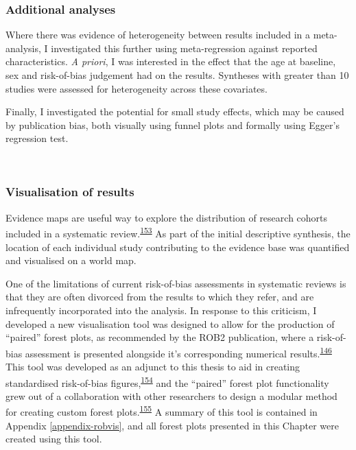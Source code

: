 \documentclass[a4paper, twoside]{templates/ociamthesis}
\begin{document}
\hypertarget{additional-analyses}{%
\subsubsection{Additional analyses}\label{additional-analyses}}

Where there was evidence of heterogeneity between results included in a meta-analysis, I investigated this further using meta-regression against reported characteristics. \emph{A priori}, I was interested in the effect that the age at baseline, sex and risk-of-bias judgement had on the results. Syntheses with greater than 10 studies were assessed for heterogeneity across these covariates.

Finally, I investigated the potential for small study effects, which may be caused by publication bias, both visually using funnel plots and formally using Egger's regression test.

~

\hypertarget{sys-rev-visualising-results}{%
\subsubsection{Visualisation of results}\label{sys-rev-visualising-results}}

Evidence maps are useful way to explore the distribution of research cohorts included in a systematic review.\textsuperscript{\protect\hyperlink{ref-saran2018}{153}} As part of the initial descriptive synthesis, the location of each individual study contributing to the evidence base was quantified and visualised on a world map.

One of the limitations of current risk-of-bias assessments in systematic reviews is that they are often divorced from the results to which they refer, and are infrequently incorporated into the analysis. In response to this criticism, I developed a new visualisation tool was designed to allow for the production of ``paired'' forest plots, as recommended by the ROB2 publication, where a risk-of-bias assessment is presented alongside it's corresponding numerical results.\textsuperscript{\protect\hyperlink{ref-sterne2019}{146}} This tool was developed as an adjunct to this thesis to aid in creating standardised risk-of-bias figures,\textsuperscript{\protect\hyperlink{ref-mcguinness2020robvisPaper}{154}} and the ``paired'' forest plot functionality grew out of a collaboration with other researchers to design a modular method for creating custom forest plots.\textsuperscript{\protect\hyperlink{ref-zotero-14999}{155}} A summary of this tool is contained in Appendix \ref{appendix-robvis}, and all forest plots presented in this Chapter were created using this tool.
\end{document}
